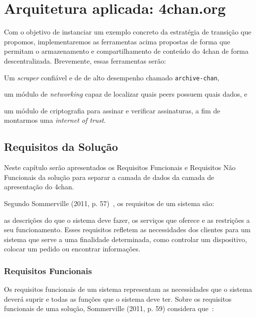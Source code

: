
\chapter{Arquitetura aplicada: 4chan.org}

Com o objetivo de instanciar um exemplo concreto da estratégia de transição que propomos, implementaremos as ferramentas acima propostas de forma que permitam o armazenamento e compartilhamento de conteúdo do 4chan de forma descentralizada.
Brevemente, essas ferramentas serão:
\begin{enumerate*}[label=(\arabic*)]
    \item Um \textit{scraper} confiável e de de alto desempenho chamado \texttt{archive-chan},
    \item um módulo de \textit{networking} capaz de localizar quais peers possuem quais dados, e
    \item um módulo de criptografia para assinar e verificar assinaturas, a fim de montarmos uma \textit{internet of trust}. 
\end{enumerate*}

\section{Requisitos da Solução}

Neste capítulo serão apresentados os Requisitos Funcionais e Requisitos Não Funcionais da solução para separar a camada de dados da camada de apresentação do 4chan.

Segundo Sommerville (2011, p. 57)~\cite{SOMMERVILLE1}, os requisitos de um sistema são:

\begin{directcite}
as descrições do que o sistema deve fazer, os serviços que
oferece e as restrições a seu funcionamento.
Esses requisitos refletem as necessidades dos clientes para
um sistema que serve a uma finalidade determinada, como controlar
um dispositivo, colocar um pedido ou encontrar informações.
\end{directcite}

\subsection{Requisitos Funcionais}

Os requisitos funcionais de um sistema representam as necessidades que o sistema deverá suprir e todas as funções que o sistema deve ter.
Sobre os requisitos funcionais de uma solução, Sommerville (2011, p. 59) considera que~\cite{SOMMERVILLE1}:

